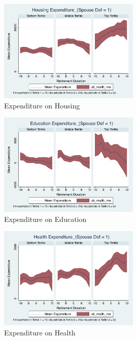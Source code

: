 \documentclass[11pt]{article}
\begin{document}
\clearpage

\begin{figure}[h]
	\caption{Expenditure on Housing}
	\centering
	\includegraphics[width=0.6\textwidth]{../ConsumptionPostRetirement_by_SpouseDef_Cats/Smoothed/1/spouse_def_total_housing_real.pdf}
\end{figure}


\begin{figure}[h]
	\caption{Expenditure on Education}
	\centering
	\includegraphics[width=0.6\textwidth]{../ConsumptionPostRetirement_by_SpouseDef_Cats/Smoothed/1/spouse_def_total_education_real.pdf}
\end{figure}
\clearpage

\begin{figure}[h]
	\caption{Expenditure on Health}
	\centering
	\includegraphics[width=0.6\textwidth]{../ConsumptionPostRetirement_by_SpouseDef_Cats/Smoothed/1/spouse_def_total_healthexpense_real.pdf}
\end{figure}
\end{document}
